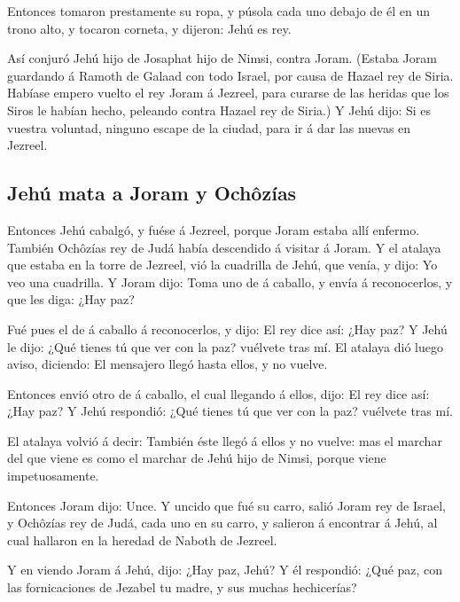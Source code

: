  Entonces tomaron prestamente su ropa, y púsola cada uno
debajo de él en un trono alto, y tocaron corneta, y dijeron: Jehú es
rey.

 Así conjuró Jehú hijo de Josaphat hijo de Nimsi, contra
Joram. (Estaba Joram guardando á Ramoth de Galaad con todo Israel, por
causa de Hazael rey de Siria.  Habíase empero vuelto el
rey Joram á Jezreel, para curarse de las heridas que los Siros le habían
hecho, peleando contra Hazael rey de Siria.) Y Jehú dijo: Si es vuestra
voluntad, ninguno escape de la ciudad, para ir á dar las nuevas en
Jezreel.

\hypertarget{jehuxfa-mata-a-joram-y-ochuxf4zuxedas}{%
\subsection{Jehú mata a Joram y
Ochôzías}\label{jehuxfa-mata-a-joram-y-ochuxf4zuxedas}}

 Entonces Jehú cabalgó, y fuése á Jezreel, porque Joram
estaba allí enfermo. También Ochôzías rey de Judá había descendido á
visitar á Joram.  Y el atalaya que estaba en la torre de
Jezreel, vió la cuadrilla de Jehú, que venía, y dijo: Yo veo una
cuadrilla. Y Joram dijo: Toma uno de á caballo, y envía á reconocerlos,
y que les diga: ¿Hay paz?

 Fué pues el de á caballo á reconocerlos, y dijo: El rey
dice así: ¿Hay paz? Y Jehú le dijo: ¿Qué tienes tú que ver con la paz?
vuélvete tras mí. El atalaya dió luego aviso, diciendo: El mensajero
llegó hasta ellos, y no vuelve.

 Entonces envió otro de á caballo, el cual llegando á
ellos, dijo: El rey dice así: ¿Hay paz? Y Jehú respondió: ¿Qué tienes tú
que ver con la paz? vuélvete tras mí.

 El atalaya volvió á decir: También éste llegó á ellos y
no vuelve: mas el marchar del que viene es como el marchar de Jehú hijo
de Nimsi, porque viene impetuosamente.

 Entonces Joram dijo: Unce. Y uncido que fué su carro,
salió Joram rey de Israel, y Ochôzías rey de Judá, cada uno en su carro,
y salieron á encontrar á Jehú, al cual hallaron en la heredad de Naboth
de Jezreel.

 Y en viendo Joram á Jehú, dijo: ¿Hay paz, Jehú? Y él
respondió: ¿Qué paz, con las fornicaciones de Jezabel tu madre, y sus
muchas hechicerías?

